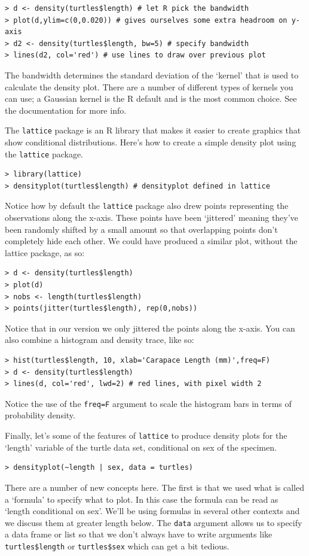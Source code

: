 \documentclass{article}
\begin{document}
\begin{lstlisting}
> d <- density(turtles$length) # let R pick the bandwidth
> plot(d,ylim=c(0,0.020)) # gives ourselves some extra headroom on y-axis
> d2 <- density(turtles$length, bw=5) # specify bandwidth
> lines(d2, col='red') # use lines to draw over previous plot
\end{lstlisting}
The bandwidth determines the standard deviation of the `kernel' that is
used to calculate the density plot. There are a number of different
types of kernels you can use; a Gaussian kernel is the R default and is
the most common choice. See the documentation for more info.

The \lstinline!lattice! package is an R library that makes it easier to
create graphics that show conditional distributions. Here's how to
create a simple density plot using the \lstinline!lattice! package.

\begin{lstlisting}
> library(lattice)
> densityplot(turtles$length) # densityplot defined in lattice
\end{lstlisting}
Notice how by default the \lstinline!lattice! package also drew points
representing the observations along the x-axis. These points have been
`jittered' meaning they've been randomly shifted by a small amount so
that overlapping points don't completely hide each other. We could have
produced a similar plot, without the lattice package, as so:

\begin{lstlisting}
> d <- density(turtles$length)
> plot(d)
> nobs <- length(turtles$length)
> points(jitter(turtles$length), rep(0,nobs)) 
\end{lstlisting}
Notice that in our version we only jittered the points along the x-axis.
You can also combine a histogram and density trace, like so:

\begin{lstlisting}
> hist(turtles$length, 10, xlab='Carapace Length (mm)',freq=F)
> d <- density(turtles$length)
> lines(d, col='red', lwd=2) # red lines, with pixel width 2    
\end{lstlisting}
Notice the use of the \lstinline!freq=F! argument to scale the histogram
bars in terms of probability density.

Finally, let's some of the features of \lstinline!lattice! to produce
density plots for the `length' variable of the turtle data set,
conditional on sex of the specimen.

\begin{lstlisting}
> densityplot(~length | sex, data = turtles)    
\end{lstlisting}
There are a number of new concepts here. The first is that we used what
is called a `formula' to specify what to plot. In this case the formula
can be read as `length conditional on sex'. We'll be using formulas in
several other contexts and we discuss them at greater length below. The
\lstinline!data! argument allows us to specify a data frame or list so
that we don't always have to write arguments like
\lstinline!turtles$length! or \lstinline!turtles$sex! which can get a
bit tedious.
\end{document}
